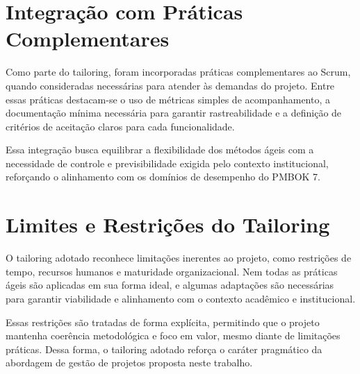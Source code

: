\section{Integração com Práticas Complementares}

Como parte do tailoring, foram incorporadas práticas complementares ao Scrum, quando consideradas necessárias para atender às demandas do projeto. Entre essas práticas destacam-se o uso de métricas simples de acompanhamento, a documentação mínima necessária para garantir rastreabilidade e a definição de critérios de aceitação claros para cada funcionalidade.

Essa integração busca equilibrar a flexibilidade dos métodos ágeis com a necessidade de controle e previsibilidade exigida pelo contexto institucional, reforçando o alinhamento com os domínios de desempenho do PMBOK 7.

\section{Limites e Restrições do Tailoring}

O tailoring adotado reconhece limitações inerentes ao projeto, como restrições de tempo, recursos humanos e maturidade organizacional. Nem todas as práticas ágeis são aplicadas em sua forma ideal, e algumas adaptações são necessárias para garantir viabilidade e alinhamento com o contexto acadêmico e institucional.

Essas restrições são tratadas de forma explícita, permitindo que o projeto mantenha coerência metodológica e foco em valor, mesmo diante de limitações práticas. Dessa forma, o tailoring adotado reforça o caráter pragmático da abordagem de gestão de projetos proposta neste trabalho.
